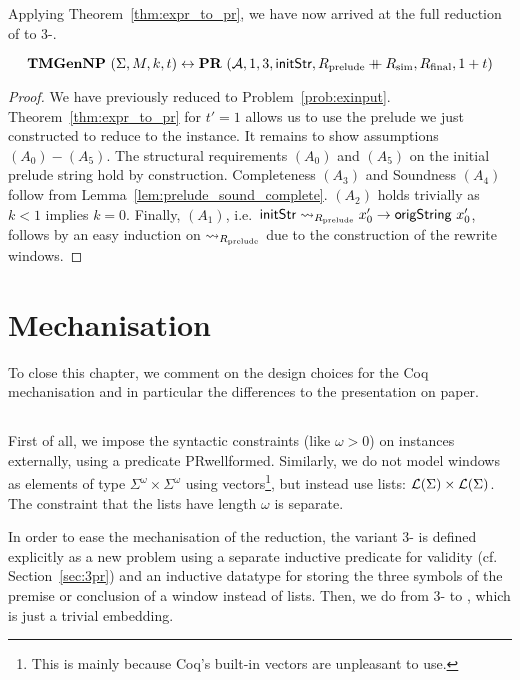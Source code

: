 Applying Theorem~\ref{thm:expr_to_pr}, we have now arrived at the full reduction of \gennp{} to 3-\PR{}.

\begin{theorem}
  \[\normalfont\textbf{TMGenNP}~(\Sigma, M, k, t) \leftrightarrow \normalfont\textbf{PR}~(\mathcal{A}, 1, 3, \textsf{initStr}, R_{\text{prelude}} \mathbin{+\mkern-10mu+} R_{\text{sim}}, R_{\text{final}}, 1 + t) \]
\end{theorem}
\begin{proof}
  We have previously reduced \gennp{} to Problem~\ref{prob:exinput}. Theorem~\ref{thm:expr_to_pr} for $t' = 1$ allows us to use the prelude we just constructed to reduce to the \PR{} instance.
  It remains to show assumptions $(A_0) - (A_5)$. 
  The structural requirements $(A_0)$ and $(A_5)$ on the initial prelude string hold by construction. 
  Completeness $(A_3)$ and Soundness $(A_4)$ follow from Lemma~\ref{lem:prelude_sound_complete}. 
  $(A_2)$ holds trivially as $k < 1$ implies $k = 0$. Finally, $(A_1)$, i.e.\ $\textsf{initStr} \rightsquigarrow_{R_{\text{prelude}}} x_0' \rightarrow \textsf{origString}~x_0'$, follows by an easy induction on $\rightsquigarrow_{R_{\text{prelude}}}$ due to the construction of the rewrite windows. 
\end{proof}

\section{Mechanisation}
To close this chapter, we comment on the design choices for the Coq mechanisation and in particular the differences to the presentation on paper. 

\subsection{\PR{}}
First of all, we impose the syntactic constraints (like $\omega > 0$) on \PR{} instances externally, using a predicate \textsf{PR\shortunderscore{}wellformed}. 
Similarly, we do not model windows as elements of type $\Sigma^\omega \times \Sigma^\omega$ using vectors\footnote{This is mainly because Coq's built-in vectors are unpleasant to use.}, but instead use lists: $\mathcal{L} (\Sigma) \times \mathcal{L} (\Sigma)$. The constraint that the lists have length $\omega$ is separate.

In order to ease the mechanisation of the reduction, the variant 3-\PR{} is defined explicitly as a new problem using a separate inductive predicate for validity (cf. Section~\ref{sec:3pr}) and an inductive datatype for storing the three symbols of the premise or conclusion of a window instead of lists.
%
Then, we do  from 3-\PR{} to \PR{}, which is just a trivial embedding.

